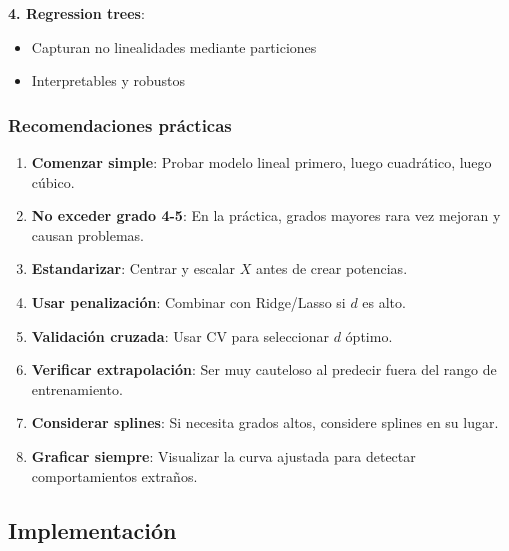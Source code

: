 \documentclass[
  doc,
  floatsintext,
  longtable,
  a4paper,
  nolmodern,
  notxfonts,
  notimes,
  12pt,
  colorlinks=true,linkcolor=blue,citecolor=blue,urlcolor=blue]{apa7}
\providecommand{\tightlist}{%
  \setlength{\itemsep}{0pt}\setlength{\parskip}{0pt}}
\begin{document}
\textbf{4. Regression trees}:

\begin{itemize}
\tightlist
\item
  Capturan no linealidades mediante particiones
\item
  Interpretables y robustos
\end{itemize}

\subsubsection{Recomendaciones
prácticas}\label{recomendaciones-pruxe1cticas-1}

\begin{enumerate}
\def\labelenumi{\arabic{enumi}.}
\item
  \textbf{Comenzar simple}: Probar modelo lineal primero, luego
  cuadrático, luego cúbico.
\item
  \textbf{No exceder grado 4-5}: En la práctica, grados mayores rara vez
  mejoran y causan problemas.
\item
  \textbf{Estandarizar}: Centrar y escalar \(X\) antes de crear
  potencias.
\item
  \textbf{Usar penalización}: Combinar con Ridge/Lasso si \(d\) es alto.
\item
  \textbf{Validación cruzada}: Usar CV para seleccionar \(d\) óptimo.
\item
  \textbf{Verificar extrapolación}: Ser muy cauteloso al predecir fuera
  del rango de entrenamiento.
\item
  \textbf{Considerar splines}: Si necesita grados altos, considere
  splines en su lugar.
\item
  \textbf{Graficar siempre}: Visualizar la curva ajustada para detectar
  comportamientos extraños.
\end{enumerate}

\subsection{Implementación}\label{implementaciuxf3n-4}
\end{document}
